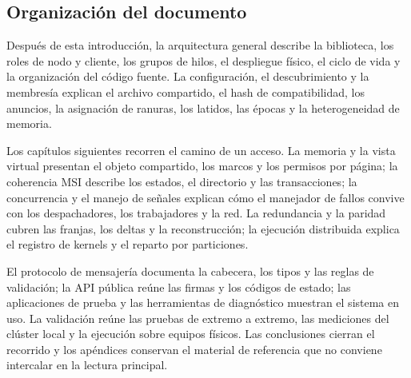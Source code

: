 \subsection{Organización del documento}

Después de esta introducción, la arquitectura general describe la biblioteca, los roles de nodo y cliente, los grupos de hilos, el despliegue físico, el ciclo de vida y la organización del código fuente. La configuración, el descubrimiento y la membresía explican el archivo compartido, el hash de compatibilidad, los anuncios, la asignación de ranuras, los latidos, las épocas y la heterogeneidad de memoria.

Los capítulos siguientes recorren el camino de un acceso. La memoria y la vista virtual presentan el objeto compartido, los marcos y los permisos por página; la coherencia MSI describe los estados, el directorio y las transacciones; la concurrencia y el manejo de señales explican cómo el manejador de fallos convive con los despachadores, los trabajadores y la red. La redundancia y la paridad cubren las franjas, los deltas y la reconstrucción; la ejecución distribuida explica el registro de kernels y el reparto por particiones.

El protocolo de mensajería documenta la cabecera, los tipos y las reglas de validación; la API pública reúne las firmas y los códigos de estado; las aplicaciones de prueba y las herramientas de diagnóstico muestran el sistema en uso. La validación reúne las pruebas de extremo a extremo, las mediciones del clúster local y la ejecución sobre equipos físicos. Las conclusiones cierran el recorrido y los apéndices conservan el material de referencia que no conviene intercalar en la lectura principal.
